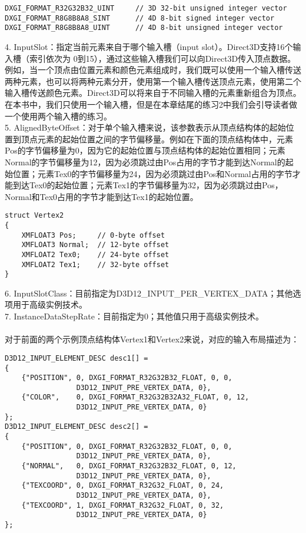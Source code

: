 \begin{flushleft}
\begin{lstlisting}
DXGI_FORMAT_R32G32B32_UINT     // 3D 32-bit unsigned integer vector
DXGI_FORMAT_R8G8B8A8_SINT      // 4D 8-bit signed integer vector
DXGI_FORMAT_R8G8B8A8_UINT      // 4D 8-bit unsigned integer vector
\end{lstlisting}
4. InputSlot：指定当前元素来自于哪个输入槽（input slot）。Direct3D支持16个输入槽（索引依次为 0到15），通过这些输入槽我们可以向Direct3D传入顶点数据。例如，当一个顶点由位置元素和颜色元素组成时，我们既可以使用一个输入槽传送两种元素，也可以将两种元素分开，使用第一个输入槽传送顶点元素，使用第二个输入槽传送颜色元素。Direct3D可以将来自于不同输入槽的元素重新组合为顶点。在本书中，我们只使用一个输入槽，但是在本章结尾的练习2中我们会引导读者做一个使用两个输入槽的练习。\\
5. AlignedByteOffset：对于单个输入槽来说，该参数表示从顶点结构体的起始位置到顶点元素的起始位置之间的字节偏移量。例如在下面的顶点结构体中，元素Pos的字节偏移量为0，因为它的起始位置与顶点结构体的起始位置相同；元素Normal的字节偏移量为12，因为必须跳过由Pos占用的字节才能到达Normal的起始位置；元素Tex0的字节偏移量为24，因为必须跳过由Pos和Normal占用的字节才能到达Tex0的起始位置；元素Tex1的字节偏移量为32，因为必须跳过由Pos，Normal和Tex0占用的字节才能到达Tex1的起始位置。\\
\begin{lstlisting}
struct Vertex2
{
    XMFLOAT3 Pos;     // 0-byte offset
    XMFLOAT3 Normal;  // 12-byte offset
    XMFLOAT2 Tex0;    // 24-byte offset
    XMFLOAT2 Tex1;    // 32-byte offset
}
\end{lstlisting}
6. InputSlotClass：目前指定为D3D12\_INPUT\_PER\_VERTEX\_DATA；其他选项用于高级实例技术。\\
7. InstanceDataStepRate：目前指定为0；其他值只用于高级实例技术。\\
~\\
对于前面的两个示例顶点结构体Vertex1和Vertex2来说，对应的输入布局描述为：
\begin{lstlisting}
D3D12_INPUT_ELEMENT_DESC desc1[] = 
{
    {"POSITION", 0, DXGI_FORMAT_R32G32B32_FLOAT, 0, 0, 
                 D3D12_INPUT_PRE_VERTEX_DATA, 0},
    {"COLOR",    0, DXGI_FORMAT_R32G32B32A32_FLOAT, 0, 12, 
                 D3D12_INPUT_PRE_VERTEX_DATA, 0}
};
D3D12_INPUT_ELEMENT_DESC desc2[] =
{
    {"POSITION", 0, DXGI_FORMAT_R32G32B32_FLOAT, 0, 0,  
                 D3D12_INPUT_PRE_VERTEX_DATA, 0},
    {"NORMAL",   0, DXGI_FORMAT_R32G32B32_FLOAT, 0, 12, 
                 D3D12_INPUT_PRE_VERTEX_DATA, 0},
    {"TEXCOORD", 0, DXGI_FORMAT_R32G32_FLOAT, 0, 24, 
                 D3D12_INPUT_PRE_VERTEX_DATA, 0},
    {"TEXCOORD", 1, DXGI_FORMAT_R32G32_FLOAT, 0, 32, 
                 D3D12_INPUT_PRE_VERTEX_DATA, 0}
};
\end{lstlisting}
\end{flushleft}
